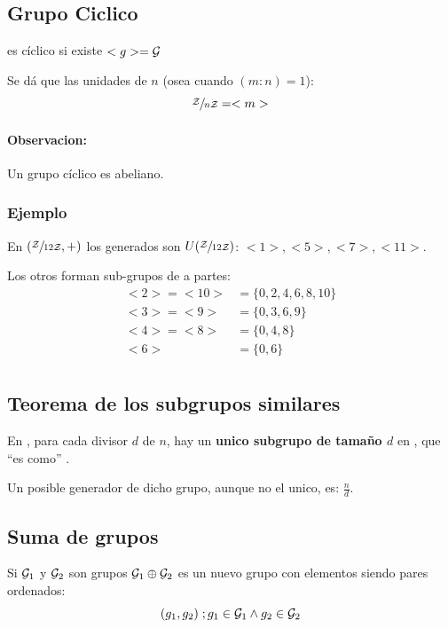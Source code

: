 \documentclass[12pt,a4paper]{report}
\begin{document}
\subsection{Grupo Ciclico}
\label{sec:grupo-ciclico}

 es cíclico si existe $<g> = \li{G}$

Se dá que las unidades de $n$ (osea cuando $(m:n) = 1$):
$$
\cuerpo[n] = <m>
$$

\paragraph{Observacion:}

Un grupo cíclico es abeliano.


\subsubsection{Ejemplo}

En $(\cuerpo[12], +)$ los generados son $U(\cuerpo[12])$: $<1>, <5>, <7>, <11>$.

Los otros forman sub-grupos de a partes:
$$
\begin{aligned}
<2> = <10> &= \{0, 2, 4, 6, 8, 10 \} \\
<3> = <9>  &= \{0, 3, 6, 9 \} \\
<4> = <8>  &= \{0, 4, 8 \} \\
<6> &= \{0, 6 \} \\
\end{aligned}
$$

\subsection{Teorema de los subgrupos similares}
\label{sec:grupos-similares}

En \cuerpo, para cada divisor $d$ de $n$, hay un \textbf{unico subgrupo de tamaño $d$} en \cuerpo, que ``es como'' \cuerpo[d]. 


Un posible generador de dicho grupo, aunque no el unico, es: $\frac{n}{d}$.

\subsection{Suma de grupos}
\label{sec:suma-grupos}

Si $\li{G}_1$ y $\li{G}_2$ son grupos $\li{G}_1 \xor \li{G}_2$ es un nuevo grupo con elementos siendo pares ordenados:
$$
(g_1, g_2) \; ; g_1 \in \li{G}_1 \land g_2 \in \li{G}_2
$$
\end{document}
